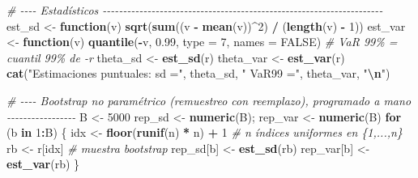 \documentclass[
  spanish,
]{article}
\newenvironment{Shaded}{\begin{snugshade}}{\end{snugshade}}
\newcommand{\AttributeTok}[1]{\textcolor[rgb]{0.13,0.29,0.53}{#1}}
\newcommand{\CommentTok}[1]{\textcolor[rgb]{0.56,0.35,0.01}{\textit{#1}}}
\newcommand{\ConstantTok}[1]{\textcolor[rgb]{0.56,0.35,0.01}{#1}}
\newcommand{\ControlFlowTok}[1]{\textcolor[rgb]{0.13,0.29,0.53}{\textbf{#1}}}
\newcommand{\DecValTok}[1]{\textcolor[rgb]{0.00,0.00,0.81}{#1}}
\newcommand{\FloatTok}[1]{\textcolor[rgb]{0.00,0.00,0.81}{#1}}
\newcommand{\FunctionTok}[1]{\textcolor[rgb]{0.13,0.29,0.53}{\textbf{#1}}}
\newcommand{\NormalTok}[1]{#1}
\newcommand{\OtherTok}[1]{\textcolor[rgb]{0.56,0.35,0.01}{#1}}
\newcommand{\SpecialCharTok}[1]{\textcolor[rgb]{0.81,0.36,0.00}{\textbf{#1}}}
\newcommand{\StringTok}[1]{\textcolor[rgb]{0.31,0.60,0.02}{#1}}
\begin{document}
\begin{Shaded}
\begin{Highlighting}[]
\CommentTok{\# {-}{-}{-}{-} Estadísticos {-}{-}{-}{-}{-}{-}{-}{-}{-}{-}{-}{-}{-}{-}{-}{-}{-}{-}{-}{-}{-}{-}{-}{-}{-}{-}{-}{-}{-}{-}{-}{-}{-}{-}{-}{-}{-}{-}{-}{-}{-}{-}{-}{-}{-}{-}{-}{-}{-}{-}{-}{-}{-}{-}{-}{-}{-}{-}{-}{-}{-}{-}{-}{-}{-}{-}{-}{-}{-}}
\NormalTok{est\_sd  }\OtherTok{\textless{}{-}} \ControlFlowTok{function}\NormalTok{(v) }\FunctionTok{sqrt}\NormalTok{(}\FunctionTok{sum}\NormalTok{((v }\SpecialCharTok{{-}} \FunctionTok{mean}\NormalTok{(v))}\SpecialCharTok{\^{}}\DecValTok{2}\NormalTok{) }\SpecialCharTok{/}\NormalTok{ (}\FunctionTok{length}\NormalTok{(v) }\SpecialCharTok{{-}} \DecValTok{1}\NormalTok{))}
\NormalTok{est\_var }\OtherTok{\textless{}{-}} \ControlFlowTok{function}\NormalTok{(v) }\FunctionTok{quantile}\NormalTok{(}\SpecialCharTok{{-}}\NormalTok{v, }\FloatTok{0.99}\NormalTok{, }\AttributeTok{type =} \DecValTok{7}\NormalTok{, }\AttributeTok{names =} \ConstantTok{FALSE}\NormalTok{)   }\CommentTok{\# VaR 99\% = cuantil 99\% de {-}r}
\NormalTok{theta\_sd  }\OtherTok{\textless{}{-}} \FunctionTok{est\_sd}\NormalTok{(r)}
\NormalTok{theta\_var }\OtherTok{\textless{}{-}} \FunctionTok{est\_var}\NormalTok{(r)}
\FunctionTok{cat}\NormalTok{(}\StringTok{"Estimaciones puntuales: sd ="}\NormalTok{, theta\_sd, }\StringTok{" VaR99 ="}\NormalTok{, theta\_var, }\StringTok{"}\SpecialCharTok{\textbackslash{}n}\StringTok{"}\NormalTok{)}

\CommentTok{\# {-}{-}{-}{-} Bootstrap no paramétrico (remuestreo con reemplazo), programado a mano {-}{-}{-}{-}{-}{-}{-}{-}{-}{-}{-}{-}{-}{-}{-}{-}{-}}
\NormalTok{B }\OtherTok{\textless{}{-}} \DecValTok{5000}
\NormalTok{rep\_sd }\OtherTok{\textless{}{-}} \FunctionTok{numeric}\NormalTok{(B); rep\_var }\OtherTok{\textless{}{-}} \FunctionTok{numeric}\NormalTok{(B)}
\ControlFlowTok{for}\NormalTok{ (b }\ControlFlowTok{in} \DecValTok{1}\SpecialCharTok{:}\NormalTok{B) \{}
\NormalTok{  idx }\OtherTok{\textless{}{-}} \FunctionTok{floor}\NormalTok{(}\FunctionTok{runif}\NormalTok{(n) }\SpecialCharTok{*}\NormalTok{ n) }\SpecialCharTok{+} \DecValTok{1}          \CommentTok{\# n índices uniformes en \{1,...,n\}}
\NormalTok{  rb  }\OtherTok{\textless{}{-}}\NormalTok{ r[idx]                           }\CommentTok{\# muestra bootstrap}
\NormalTok{  rep\_sd[b]  }\OtherTok{\textless{}{-}} \FunctionTok{est\_sd}\NormalTok{(rb)}
\NormalTok{  rep\_var[b] }\OtherTok{\textless{}{-}} \FunctionTok{est\_var}\NormalTok{(rb)}
\NormalTok{\}}


\end{Highlighting}
\end{Shaded}
\end{document}

